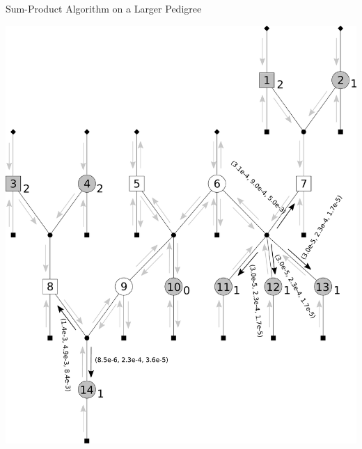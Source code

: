 \documentclass[letter,graphicx]{beamer}
\begin{document}
\begin{frame}{Sum-Product Algorithm on a Larger Pedigree} 
\begin{center} 
\includegraphics[height = 0.8\textheight]{./images/mg-example-step9.pdf} 
\end{center}
\end{frame}
\end{document}
